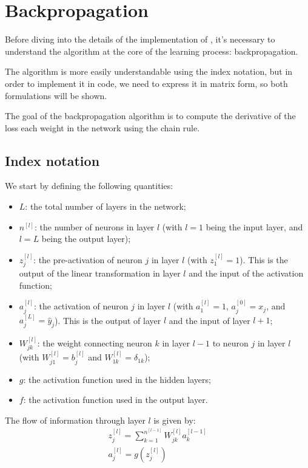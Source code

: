\section{Backpropagation} \label{sec:backprop}
Before diving into the details of the implementation of \mfnet, it's necessary to understand the algorithm at the core of the learning process: backpropagation.

The algorithm is more easily understandable using the index notation, but in order to implement it in code, we need to express it in matrix form, so both formulations will be shown.

The goal of the backpropagation algorithm is to compute the derivative of the loss \wrt each weight in the network using the chain rule.

\subsection{Index notation} \label{sec:index_notation}
We start by defining the following quantities:
\begin{itemize}
    \item $L$: the total number of layers in the network;
    \item $n^{[l]}$: the number of neurons in layer $l$ (with $l = 1$ being the input layer, and $l = L$ being the output layer);
    \item $z_j^{[l]}$: the pre-activation of neuron $j$ in layer $l$ (with $z_1^{[l]} = 1$). This is the output of the linear transformation in layer $l$ and the input of the activation function;
    \item $a_j^{[l]}$: the activation of neuron $j$ in layer $l$ (with $a_1^{[l]} = 1$, $a_j^{[0]} = x_j$, and $a_j^{[L]} = \hat{y}_j$). This is the output of layer $l$ and the input of layer $l+1$;
    \item $W_{jk}^{[l]}$: the weight connecting neuron $k$ in layer $l-1$ to neuron $j$ in layer $l$ (with $W_{j1}^{[l]} = b_j^{[l]}$ and $W_{1k}^{[l]} = \delta_{1k}$);
    \item $g$: the activation function used in the hidden layers;
    \item $f$: the activation function used in the output layer.
\end{itemize}

The flow of information through layer $l$ is given by:
\begin{gather*}
    z_j^{[l]} = \sum_{k=1}^{n^{[l-1]}} W_{jk}^{[l]} a_k^{[l-1]} \\
    a_j^{[l]} = g\left(z_j^{[l]}\right)
\end{gather*}


